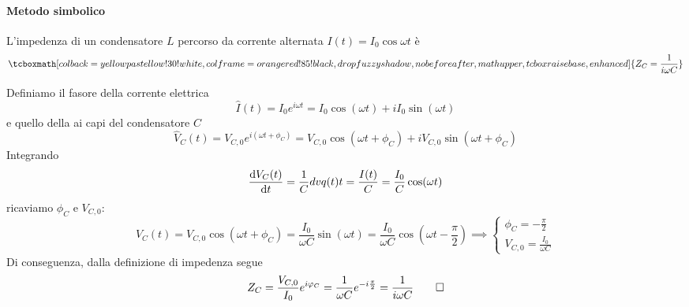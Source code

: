 \paragraph{Metodo simbolico}
\begin{proposition}
	L'impedenza di un condensatore $L$ percorso da corrente alternata $I(t)=I_0\cos\omega t$ è
	\begin{equation}
		\tcboxmath[colback=yellowpastellow!30!white,colframe=orangered!85!black,drop fuzzy shadow, nobeforeafter, math upper, tcbox raise base, enhanced]{Z_C=\frac{1}{i \omega C}}
	\end{equation}
\end{proposition}
\begin{demonstrationopt}
	Definiamo il fasore della corrente elettrica
	\begin{equation*}
		\hat{I}(t)=I_0e^{i\omega t}=I_0\cos(\omega t)+iI_0\sin(\omega t)
	\end{equation*}
	e quello della \ddp ai capi del condensatore $C$
	\begin{equation*}
		\hat{V}_C(t)=V_{C,0}e^{i(\omega t+\phi_C)}=V_{C,0}\cos(\omega t+\phi_C)+iV_{C,0}\sin(\omega t+\phi_C)
	\end{equation*}
	Integrando
	\begin{equation*}
		\dv{V_C(t)}{t}=\frac{1}{C}dv{q(t)}{t}=\frac{I(t)}{C}=\frac{I_0}{C}\cos(\omega t)
	\end{equation*}
	ricaviamo $\phi_C$ e $V_{C,0}$:
	\begin{equation*}
		V_C(t)=V_{C,0}\cos(\omega t+\phi_C)=\frac{I_0}{\omega C}\sin(\omega t)=\frac{I_0}{\omega C}\cos(\omega t-\frac{\pi}{2})\implies \begin{cases}
			\phi_C=-\frac{\pi}{2}\\
			V_{C,0}=\frac{I_0}{\omega C}
		\end{cases} 
	\end{equation*}
	Di conseguenza, dalla definizione di impedenza segue
	\begin{equation*}
		Z_C=\frac{V_{C,0}}{I_0}e^{i\oldphi_C}=\frac{1}{\omega C}e^{-i\frac{\pi}{2}}=\frac{1}{i \omega C}\qedhere
	\end{equation*}
\end{demonstrationopt}

